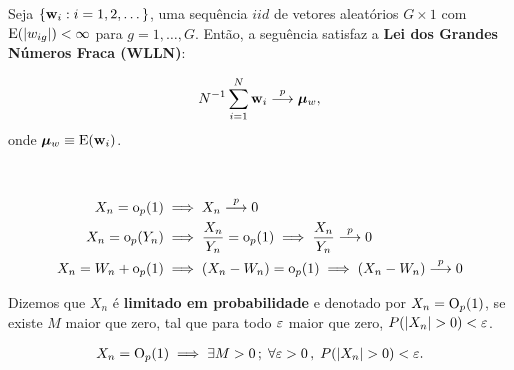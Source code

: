 \documentclass[11pt, oneside, a4paper, article]{article}
\numberwithin{equation}{section}
\begin{document}
\begin{description}
\begin{teo} \label{teo:lgn:mat}
	\citet[Teo 3.1, p.39 ]{wool-2010}

	Seja $\{\mathbf{w}_{i} : i=1,2, \dots\}$, uma sequência $iid$ de vetores aleatórios $G \times 1$ com
	$\text{E}(|w_{ig}|) < \infty$ para $g = 1, \dots, G$.
	Então, a seguência satisfaz a \textbf{Lei dos Grandes Números Fraca (WLLN)}:

	\vspace{-1 em}
	\begin{align*}
		N^{-1} \sum_{i=1}^{N}
		\mathbf{w}_{i}  \overset{p}{\longrightarrow}  \boldsymbol{\mu}_{w},
	\end{align*}
	onde $\boldsymbol{\mu}_{w} \equiv \text{E}(\mathbf{w}_{i})$.
\end{teo}

\begin{defn}[$\litop$]
\item
	\citet[Def 3.4, p.36 ]{wool-2010}\\
	\citet[Lemma 3.2, p.36 ]{wool-2010}

	\vspace{-1 em}
	\begin{align*}
		X_{n} = \text{o}_{p}(1) & \implies X_{n}  \overset{p}{\longrightarrow}  0
		\\
		X_{n} = \text{o}_{p}(Y_{n}) & \implies
		\frac{X_{n}}{Y_{n}} = \text{o}_{p}(1) \implies
		\frac{X_{n}}{Y_{n}}  \overset{p}{\longrightarrow}  0
		\\
		X_{n} = W_{n} + \text{o}_{p}(1) & \implies
		(X_{n} - W_{n}) = \text{o}_{p}(1) \implies
		(X_{n} - W_{n})  \overset{p}{\longrightarrow}  0
	\end{align*}
\end{defn}

\begin{defn}
	\citet[Def 3.3 (3), p.36 ]{wool-2010}

	Dizemos que $X_{n}$ é \textbf{limitado em probabilidade} e denotado por 
	$X_{n} = \text{O}_{p}(1)$,
	se existe $M$ maior que zero, tal que para todo $\varepsilon$ maior que zero, $P( | X_{n} | > 0) < \varepsilon$.

	\vspace{-1 em}
	\begin{align*}
		X_{n} = \text{O}_{p}(1) \implies \exists M > 0 \, ; \;
		\forall \varepsilon > 0 \, , \;
		P( | X_{n} | > 0) < \varepsilon.
	\end{align*}
\end{defn}


\end{description}
\end{document}
